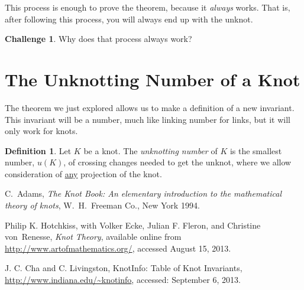 \documentclass[12pt,letterpaper]{article}
\theoremstyle{definition}
\newtheorem*{challenge}{Challenge}
\newtheorem*{definition}{Definition}
\begin{document}
This process is enough to prove the theorem, because it \emph{always} works.
That is, after following this process, you will always end up with the unknot.

\begin{challenge}
Why does that process always work?
\end{challenge}


\section*{The Unknotting Number of a Knot}

The theorem we just explored allows us to make a definition of a new invariant. This invariant will be a number, much like linking number for links, but it will only work for knots.

\begin{definition}
Let $K$ be a knot.
The \emph{unknotting number} of $K$ is the smallest number, $u(K)$, of crossing changes needed to get the unknot, where we allow consideration of \underline{any} projection of the knot.
\end{definition}




\begin{thebibliography}{9}


    C.~Adams,
    \emph{The Knot Book: An elementary introduction to the mathematical theory of knots},
    W.~H.~Freeman Co., New York 1994.

	Philip K. Hotchkiss, with Volker Ecke, Julian F. Fleron, and Christine von~Renesse,
	\emph{Knot Theory},
	available online from \url{http://www.artofmathematics.org/},
	accessed August 15, 2013.

	J. C. Cha and C. Livingston,
	KnotInfo: Table of Knot Invariants,
	\url{http://www.indiana.edu/~knotinfo},
	accessed: September 6, 2013.


\end{thebibliography}
\end{document}
